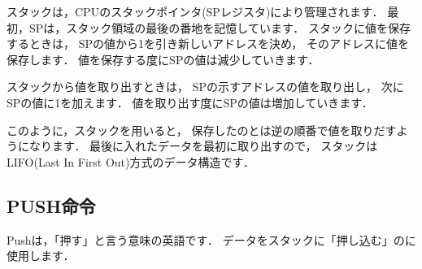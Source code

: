 スタックは，CPUのスタックポインタ(SPレジスタ)により管理されます．
最初，SPは，スタック領域の最後の番地を記憶しています．
スタックに値を保存するときは，
SPの値から1を引き新しいアドレスを決め，
そのアドレスに値を保存します．
値を保存する度にSPの値は減少していきます．

スタックから値を取り出すときは，
SPの示すアドレスの値を取り出し，
次にSPの値に1を加えます．
値を取り出す度にSPの値は増加していきます．

\begin{center}
\epsfxsize=6.5cm
\end{center}
\vspace{-0.2cm}

このように，スタックを用いると，
保存したのとは逆の順番で値を取りだすようになります．
最後に入れたデータを最初に取り出すので，
スタックはLIFO(Last In First Out)方式のデータ構造です．

\subsection{PUSH命令}

Pushは，「押す」と言う意味の英語です．
データをスタックに「押し込む」のに使用します．

